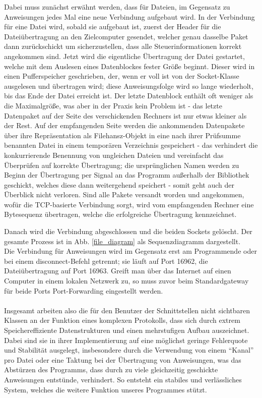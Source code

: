 Dabei muss zunächst erwähnt werden, dass für Dateien, im Gegensatz zu Anweisungen jedes Mal eine neue Verbindung aufgebaut wird.
In der Verbindung für eine Datei wird, sobald sie aufgebaut ist, zuerst der Header für die Dateiübertragung an den Zielcomputer gesendet, welcher genau dasselbe Paket dann zurückschickt um sicherzustellen, dass alle Steuerinformationen korrekt angekommen sind.
Jetzt wird die eigentliche Übertragung der Datei gestartet, welche mit dem Auslesen eines Datenblockes fester Größe beginnt.
Dieser wird in einen Pufferspeicher geschrieben, der, wenn er voll ist von der Socket-Klasse ausgelesen und übertragen wird; diese Anweisungsfolge wird so lange wiederholt, bis das Ende der Datei erreicht ist.
Der letzte Datenblock enthält oft weniger als die Maximalgröße, was aber in der Praxis kein Problem ist - das letzte Datenpaket auf der Seite des verschickenden Rechners ist nur etwas kleiner als der Rest.
Auf der empfangenden Seite werden die ankommenden Datenpakete über ihre Repräsentation als Filehansz-Objekt in eine nach ihrer Prüfsumme benannten Datei in einem temporären Verzeichnis gespeichert - das verhindert die konkurrierende Benennung von ungleichen Dateien und vereinfacht das Überprüfen auf korrekte Übertragung; die ursprünglichen Namen werden zu Beginn der Übertragung per Signal an das Programm außerhalb der Bibliothek geschickt, welches diese dann weitergehend speichert - somit geht auch der Überblick nicht verloren.
Sind alle Pakete versandt worden und angekommen, wofür die TCP-basierte Verbindung sorgt, wird vom empfangenden Rechner eine Bytesequenz übertragen, welche die erfolgreiche Übertragung kennzeichnet.\par
Danach wird die Verbindung abgeschlossen und die beiden Sockets gelöscht.
Der gesamte Prozess ist in Abb. \ref{file_diagram} als Sequenzdiagramm dargestellt.\\
Die Verbindung für Anweisungen wird im Gegensatz erst am Programmende oder bei einem disconnect-Befehl getrennt; sie läuft auf Port 16962, die Dateiübertragung auf Port 16963.
Greift man über das Internet auf einen Computer in einem lokalen Netzwerk zu, so muss zuvor beim Standardgateway für beide Ports Port-Forwarding eingestellt werden.\\\\
Insgesamt arbeiten also die für den Benutzer der Schnittstellen nicht sichtbaren Klassen an der Funktion eines komplexen Protokolls, dass sich durch extrem Speichereffiziente Datenstrukturen und einen mehrstufigen Aufbau auszeichnet.
Dabei sind sie in ihrer Implementierung auf eine möglichst geringe Fehlerquote und Stabilität ausgelegt, insbesondere durch die Verwendung von einem "`Kanal"' pro Datei oder eine Taktung bei der Übertragung von Anweisungen, was das Abstürzen des Programms, dass durch zu viele gleichzeitig geschickte Anweisungen entstünde, verhindert.
So entsteht ein stabiles und verlässliches System, welches die weitere Funktion unseres Programmes stützt.
%